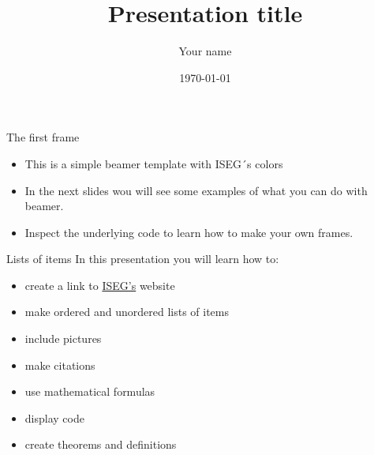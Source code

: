 


\title[Presentation title]{Presentation title}

\author[Your name]{Your name}

\date{\today}



\begin{frame}
	\titlepage
\end{frame}


\begin{frame}{The first frame}
	\begin{itemize}
		\item This is a simple beamer template with ISEG´s colors
		\item In the next slides wou will see some examples of what you can do with beamer.
		\item Inspect the underlying code to learn how to make your own frames.
	\end{itemize}
\end{frame}

\begin{frame}{Lists of items}
	In this presentation you will learn how to:
	\begin{itemize}
	\item create a link to  \href{https://www.iseg.ulisboa.pt/aquila/instituicao/ISEG/}{ISEG's} website
	\item make ordered and unordered lists of items
	\item include pictures
	\item make citations
	\item use mathematical formulas
	\item display code
	\item create theorems and definitions
	\end{itemize}
\end{frame}

